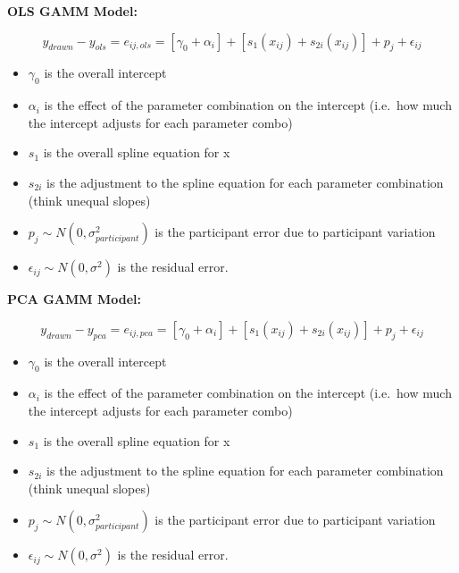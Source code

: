 \documentclass[print]{nuthesis}
\providecommand{\tightlist}{%
  \setlength{\itemsep}{0pt}\setlength{\parskip}{0pt}}
\begin{document}
\textbf{OLS GAMM Model:}

\[y_{drawn} - y_{ols} = e_{ij,ols} = \left[\gamma_0 + \alpha_i\right] + \left[s_1(x_{ij}) + s_{2i}(x_{ij}) \right] + p_{j} + \epsilon_{ij}\]

\begin{itemize}
\tightlist
\item
  \(\gamma_0\) is the overall intercept
\item
  \(\alpha_i\) is the effect of the parameter combination on the intercept (i.e.~how much the intercept adjusts for each parameter combo)
\item
  \(s_1\) is the overall spline equation for x
\item
  \(s_{2i}\) is the adjustment to the spline equation for each parameter combination (think unequal slopes)
\item
  \(p_{j} \sim N(0, \sigma^2_{participant})\) is the participant error due to participant variation
\item
  \(\epsilon_{ij} \sim N(0, \sigma^2)\) is the residual error.
\end{itemize}

\textbf{PCA GAMM Model:}

\[y_{drawn} - y_{pca} = e_{ij,pca} = \left[\gamma_0 + \alpha_i\right] + \left[s_1(x_{ij}) + s_{2i}(x_{ij}) \right] + p_{j} + \epsilon_{ij}\]

\begin{itemize}
\tightlist
\item
  \(\gamma_0\) is the overall intercept
\item
  \(\alpha_i\) is the effect of the parameter combination on the intercept (i.e.~how much the intercept adjusts for each parameter combo)
\item
  \(s_1\) is the overall spline equation for x
\item
  \(s_{2i}\) is the adjustment to the spline equation for each parameter combination (think unequal slopes)
\item
  \(p_{j} \sim N(0, \sigma^2_{participant})\) is the participant error due to participant variation
\item
  \(\epsilon_{ij} \sim N(0, \sigma^2)\) is the residual error.
\end{itemize}
\end{document}
